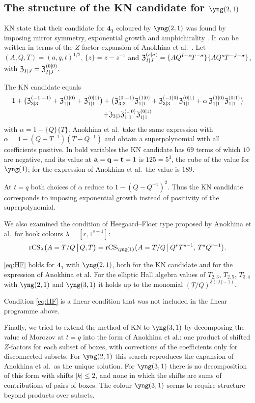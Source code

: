 \subsection{The structure of the KN candidate for \texorpdfstring{$\protect\yng(2,1)$}{[2,1]}}\label{sec:fig8-21}
KN state that their candidate for $\mathbf{4_1}$ coloured by $\yng(2,1)$ was found by imposing mirror symmetry, exponential growth and amphichirality \cite{Kameyama17}.
It can be written in terms of the $Z$-factor expansion of Anokhina et al.\ \cite{Anokhina12}.
Let $(A,Q,T)=(a,q,t)^{1/2}$, $\{z\}=z-z^{-1}$ and $\mathfrak{Z}_{I|J}^{(s|\sigma)}=\{AQ^{I+s}T^{-\sigma}\}\{AQ^sT^{-J-\sigma}\}$, with $\mathfrak{Z}_{I|J}=\mathfrak{Z}_{I|J}^{(0|0)}$.
\begin{compresult}\label{cr:fig8-21}
The KN candidate equals
\begin{multline*}
1+\bigl(\mathfrak{Z}^{(-1|-1)}_{3|3}+\mathfrak{Z}^{(1|0)}_{1|1}+\mathfrak{Z}^{(0|1)}_{1|1}\bigr)
+\bigl(\mathfrak{Z}^{(0|-1)}_{3|3}\mathfrak{Z}^{(1|0)}_{1|1}+\mathfrak{Z}^{(-1|0)}_{3|3}\mathfrak{Z}^{(0|1)}_{1|1}+\alpha\,\mathfrak{Z}^{(1|0)}_{1|1}\mathfrak{Z}^{(0|1)}_{1|1}\bigr)\\
+\mathfrak{Z}_{3|3}\mathfrak{Z}^{(1|0)}_{1|1}\mathfrak{Z}^{(0|1)}_{1|1}
\end{multline*}
with $\alpha=1-\{Q\}\{T\}$.
Anokhina et al.\ take the same expression with $\alpha=1-(Q-T^{-1})(T-Q^{-1})$ and obtain a superpolynomial with all coefficients positive.
In bold variables the KN candidate has $69$ terms of which $10$ are negative, and its value at $\mathbf{a}=\mathbf{q}=\mathbf{t}=1$ is $125=5^3$, the cube of the value for $\yng(1)$; for the expression of Anokhina et al.\ the value is $189$.
\end{compresult}
At $t=q$ both choices of $\alpha$ reduce to $1-(Q-Q^{-1})^2$.
Thus the KN candidate corresponds to imposing exponential growth instead of positivity of the superpolynomial.

We also examined the condition of Heegaard--Floer type proposed by Anokhina et al.\ for hook colours $\lambda=[r,1^{s-1}]$:
\begin{equation}\label{eq:HF}
\rCS_\lambda\bigl(A=T/Q\,\big|\,Q,T\bigr)=\rCS_{\yng(1)}\bigl(A=T/Q\,\big|\,Q^rT^{s-1},\,T^sQ^{r-1}\bigr).
\end{equation}
\begin{compresult}\label{cr:HF}
\eqref{eq:HF} holds for $\mathbf{4_1}$ with $\yng(2,1)$, both for the KN candidate and for the expression of Anokhina et al.
For the elliptic Hall algebra values of $T_{2,3}$, $T_{2,5}$, $T_{3,4}$ with $\yng(2,1)$ and $\yng(3,1)$ it holds up to the monomial $(T/Q)^{\delta(|\lambda|-1)}$.
\end{compresult}
Condition \eqref{eq:HF} is a linear condition that was not included in the linear programme above.

Finally, we tried to extend the method of KN to $\yng(3,1)$ by decomposing the value of Morozov at $t=q$ into the form of Anokhina et al.:
one product of shifted $Z$-factors for each subset of boxes, with corrections of the coefficients only for disconnected subsets.
For $\yng(2,1)$ this search reproduces the expansion of Anokhina et al.\ as the unique solution.
For $\yng(3,1)$ there is no decomposition of this form with shifts $|k|\le2$, and none in which the shifts are sums of contributions of pairs of boxes.
The colour $\yng(3,1)$ seems to require structure beyond products over subsets.
